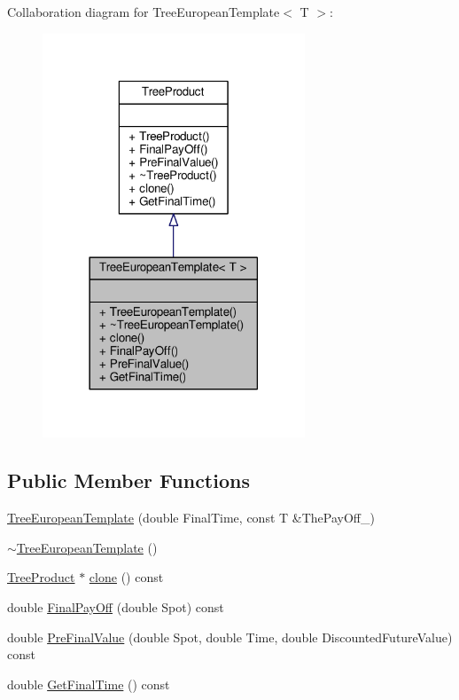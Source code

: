 Collaboration diagram for Tree\+European\+Template$<$ T $>$\+:
\nopagebreak
\begin{figure}[H]
\begin{center}
\leavevmode
\includegraphics[width=222pt]{classTreeEuropeanTemplate__coll__graph}
\end{center}
\end{figure}
\subsection*{Public Member Functions}
\begin{DoxyCompactItemize}
\item 
\hyperlink{classTreeEuropeanTemplate_a843c2ede088f0a9a720746dcbbf32b39}{Tree\+European\+Template} (double Final\+Time, const T \&The\+Pay\+Off\+\_\+)
\item 
\hyperlink{classTreeEuropeanTemplate_a20ac647ce669c800b70cfc7102678b95}{$\sim$\+Tree\+European\+Template} ()
\item 
\hyperlink{classTreeProduct}{Tree\+Product} $\ast$ \hyperlink{classTreeEuropeanTemplate_ab295adeefbb84f93854f07f511742ae7}{clone} () const
\item 
double \hyperlink{classTreeEuropeanTemplate_a20fe052329fc532eb24931a4e7e20a63}{Final\+Pay\+Off} (double Spot) const
\item 
double \hyperlink{classTreeEuropeanTemplate_a09419e2ce4ef3564661a45440ed24882}{Pre\+Final\+Value} (double Spot, double Time, double Discounted\+Future\+Value) const
\item 
double \hyperlink{classTreeEuropeanTemplate_a124fd0032ba1a95cbf1a687884859dce}{Get\+Final\+Time} () const
\end{DoxyCompactItemize}


